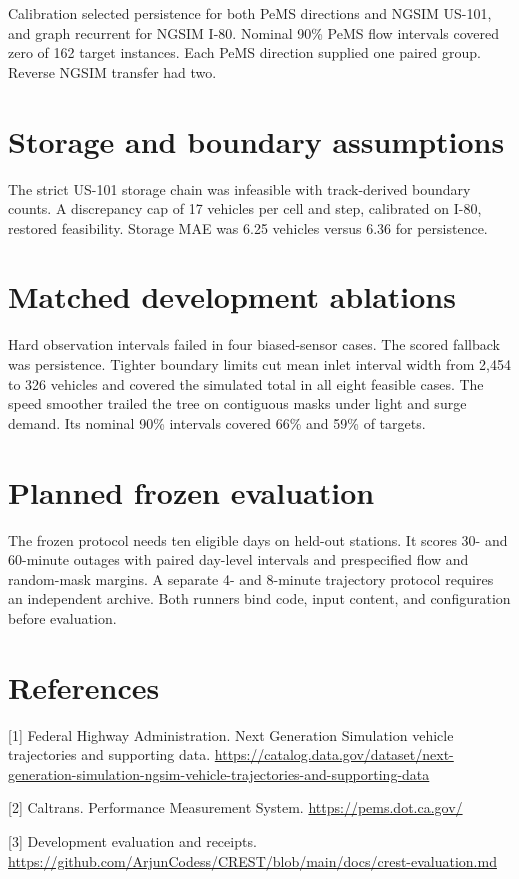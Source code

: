 \documentclass[conference]{IEEEtran}
\begin{document}
Calibration selected persistence for both PeMS directions and NGSIM US-101, and graph
recurrent for NGSIM I-80. Nominal 90\% PeMS flow intervals covered zero of 162 target
instances. Each PeMS direction supplied one paired group. Reverse NGSIM transfer had two.

\section*{Storage and boundary assumptions}
The strict US-101 storage chain was infeasible with track-derived boundary counts. A
discrepancy cap of 17 vehicles per cell and step, calibrated on I-80, restored feasibility.
Storage MAE was 6.25 vehicles versus 6.36 for persistence.

\section*{Matched development ablations}
Hard observation intervals failed in four biased-sensor cases. The scored fallback was
persistence. Tighter boundary limits cut mean inlet interval width from 2,454 to 326
vehicles and covered the simulated total in all eight feasible cases. The speed smoother
trailed the tree on contiguous masks under light and surge demand. Its nominal 90\%
intervals covered 66\% and 59\% of targets.

\section*{Planned frozen evaluation}
The frozen protocol needs ten eligible days on held-out stations. It scores 30- and
60-minute outages with paired day-level intervals and prespecified flow and random-mask
margins. A separate 4- and 8-minute trajectory protocol requires an independent archive.
Both runners bind code, input content, and configuration before evaluation.

\section*{References}
[1] Federal Highway Administration. Next Generation Simulation vehicle trajectories and
supporting data.
\url{https://catalog.data.gov/dataset/next-generation-simulation-ngsim-vehicle-trajectories-and-supporting-data}

[2] Caltrans. Performance Measurement System. \url{https://pems.dot.ca.gov/}

[3] Development evaluation and receipts.
\url{https://github.com/ArjunCodess/CREST/blob/main/docs/crest-evaluation.md}
\end{document}
